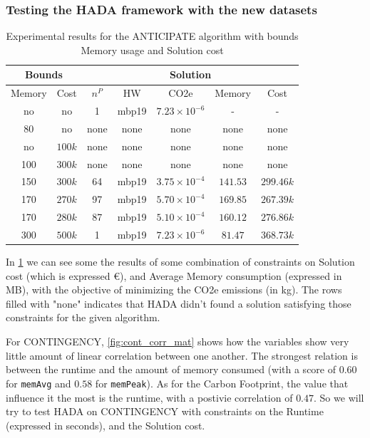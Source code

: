 \documentclass[a4paper,singleside,12pt]{report} %
\begin{document}
\subsubsection{Testing the HADA framework with the new datasets}

\begin{table}[h!]
    \centering
    \begin{tabular}{|cc|ccccc|}
        \hline
        \multicolumn{2}{|c|}{Bounds} & \multicolumn{5}{c|}{Solution} \\
        \hline
        Memory & Cost & $n^P$ & HW & CO2e & Memory & Cost \\
        \hline
        no & no & 1 & mbp19 & $7.23 \times 10^{-6}$ & - & - \\
        80 & no & none & none & none & none & none \\
        no & $100k$ & none & none & none & none & none \\
        100 & $300k$ & none & none & none & none & none \\
        150 & $300k$ & 64 & mbp19 & $3.75 \times 10^{-4}$ & $141.53$ & $299.46k$ \\
        170 & $270k$ & 97 & mbp19 & $5.70 \times 10^{-4}$ & $169.85$ & $267.39k$ \\
        170 & $280k$ & 87 & mbp19 & $5.10 \times 10^{-4}$ & $160.12$ & $276.86k$ \\
        300 & $500k$ & 1 & mbp19 & $7.23 \times 10^{-6}$ & $81.47$ & $368.73k$ \\
        \hline
    \end{tabular}
    \caption{Experimental results for the ANTICIPATE algorithm with bounds Memory usage and Solution cost}
    \label{tab:anticipate_results}
\end{table}

In \ref{tab:anticipate_results} we can see some the results of some combination of constraints on Solution cost (which is
expressed €), and Average Memory consumption (expressed in MB), with the objective of minimizing the CO2e 
emissions (in kg). The rows filled with "none" indicates that HADA didn't found a solution satisfying those constraints for the
given algorithm.

For CONTINGENCY, \ref{fig:cont_corr_mat} shows how the variables show very little amount of linear correlation between one another. The strongest relation is between the runtime and the amount of memory consumed
(with a score of $0.60$ for \verb|memAvg| and $0.58$ for \verb|memPeak|). As for the Carbon Footprint, the value that influence it the most is the runtime, with a postivie correlation of $0.47$.
So we will try to test HADA on CONTINGENCY with constraints on the Runtime (expressed in seconds), and the Solution cost.
\end{document}
